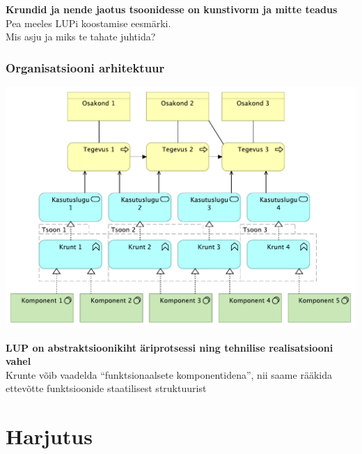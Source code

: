 \documentclass{beamer}
\begin{document}
\begin{frame}[fragile]
	\begin{center}
		\LARGE{\textbf{Krundid ja nende jaotus tsoonidesse on kunstivorm ja mitte teadus}}
		\\[4cm]
		\small{Pea meeles LUPi koostamise eesmärki. \\Mis asju ja miks te tahate juhtida?}
	\end{center}
\end{frame}


\begin{frame}[fragile]
	\frametitle{Organisatsiooni arhitektuur}

	\begin{center}
	\includegraphics[width=.9\textwidth]{kihid.pdf}
	\end{center}
\end{frame}

\begin{frame}[fragile]
	\begin{center}
		\LARGE{\textbf{LUP on abstraktsioonikiht äriprotsessi ning tehnilise realisatsiooni vahel}}
		\\[4cm]
		\small{Krunte võib vaadelda \enquote{funktsionaalsete komponentidena}, nii saame rääkida ettevõtte funktsioonide staatilisest struktuurist}
	\end{center}
\end{frame}


\section{Harjutus}
\end{document}
